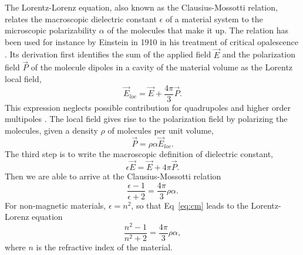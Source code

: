 The Lorentz-Lorenz equation, also known as the Clausius-Mossotti relation, relates the macroscopic dielectric constant $\epsilon$ of a material system to the microscopic  polarizability $\alpha$ of the molecules that make it up. The relation has been used for instance by Einstein in 1910 in his treatment of critical opalescence \cite{einstein1910}. Its derivation first identifies the sum of the applied field $\vec{E}$ and the polarization field $\vec{P}$ of the molecule dipoles in a cavity of the material volume as the Lorentz local field, 
\begin{equation}
\label{eq:Lorentzlocalfield}
\vec{E}_{loc} = \vec{E} + \frac{4\pi}{3} \vec{P}.
\end{equation}
This expression neglects possible contribution for quadrupoles and higher order multipoles \cite{jackson75, aspnes82}. 
The local field gives rise to the polarization field by polarizing the molecules, given a density $\rho$ of molecules per unit volume,
\begin{equation}
\vec{P} = \rho \alpha \vec{E}_{loc}.
\end{equation}
The third step is to write the macroscopic definition of dielectric constant,
\begin{equation}
\epsilon \vec{E} = \vec{E} + 4 \pi \vec{P}.
\end{equation} 
Then we are able to arrive at the Clausius-Mossotti relation
\begin{equation}
\label{eq:cm}
\frac{\epsilon -1}{\epsilon +2} = \frac{4\pi}{3} \rho \alpha.
\end{equation}
For non-magnetic materials, $\epsilon = n^2$, so that Eq~\eqref{eq:cm} leads to the Lorentz-Lorenz equation
\begin{equation}
\frac{n^2 - 1}{n^2 + 2} = \frac{4\pi}{3} \rho \alpha,
\end{equation}
where $n$ is the refractive index of the material.

